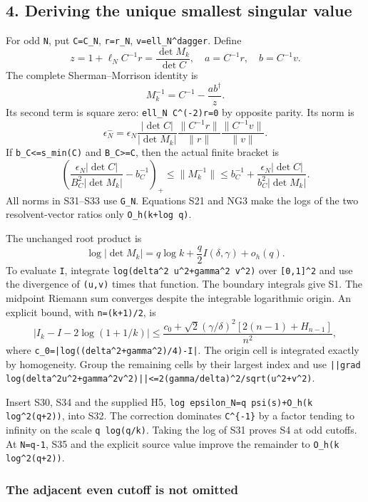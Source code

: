 \documentclass[11pt]{article}
\begin{document}
\subsection{4. Deriving the unique smallest singular value}\label{deriving-the-unique-smallest-singular-value}

For odd \texttt{N}, put \texttt{C=C\_N}, \texttt{r=r\_N}, \texttt{v=ell\_N\^{}dagger}. Define \[
 z=1+\ell_NC^{-1}r=\frac{\det M_k}{\det C},\quad
 a=C^{-1}r,\quad b=C^{-1}v.
\] The complete Sherman--Morrison identity is \[
 M_k^{-1}=C^{-1}-\frac{ab^\dagger}{z}.                            \tag{S31}
\] Its second term is square zero: \texttt{ell\_N\ C\^{}(-2)r=0} by opposite parity. Its norm is \[
 \epsilon_N^-=
 \epsilon_N\frac{|\det C|}{|\det M_k|}
 \frac{\|C^{-1}r\|}{\|r\|}\frac{\|C^{-1}v\|}{\|v\|}.             \tag{S32}
\] If \texttt{b\_C\textless{}=s\_min(C)} and \texttt{B\_C\textgreater{}=\textbar{}\textbar{}C\textbar{}\textbar{}}, then the actual finite bracket is \[
 \left(\frac{\epsilon_N|\det C|}{B_C^2|\det M_k|}-b_C^{-1}\right)_+
 \le\|M_k^{-1}\|
 \le b_C^{-1}+\frac{\epsilon_N|\det C|}{b_C^2|\det M_k|}.           \tag{S33}
\] All norms in S31--S33 use \texttt{G\_N}. Equations S21 and NG3 make the logs of the two resolvent-vector ratios only \texttt{O\_h(k+log\ q)}.

The unchanged root product is \[
 \log|\det M_k|=q\log k+\frac q2 I(\delta,\gamma)+o_h(q).           \tag{S34}
\] To evaluate \texttt{I}, integrate \nolinkurl{log(delta^2 u^2+gamma^2 v^2)} over \texttt{{[}0,1{]}\^{}2} and use the divergence of \texttt{(u,v)} times that function. The boundary integrals give S1. The midpoint Riemann sum converges despite the integrable logarithmic origin. An explicit bound, with \texttt{n=(k+1)/2}, is \[
 \left|I_k-I-2\log(1+1/k)\right|
 \le\frac{c_0+\sqrt2(\gamma/\delta)^2[2(n-1)+H_{n-1}]}{n^2},       \tag{S35}
\] where \nolinkurl{c_0=|log((delta^2+gamma^2)/4)-I|}. The origin cell is integrated exactly by homogeneity. Group the remaining cells by their largest index and use \nolinkurl{||grad log(delta^2u^2+gamma^2v^2)||<=2(gamma/delta)^2/sqrt(u^2+v^2)}.

Insert S30, S34 and the supplied H5, \nolinkurl{log epsilon_N=q psi(s)+O_h(k log^2(q+2))}, into S32. The correction dominates \texttt{C\^{}\{-1\}} by a factor tending to infinity on the scale \texttt{q\ log(q/k)}. Taking the log of S31 proves S4 at odd cutoffs. At \texttt{N=q-1}, S35 and the explicit source value improve the remainder to \nolinkurl{O_h(k log^2(q+2))}.

\subsubsection{The adjacent even cutoff is not omitted}\label{the-adjacent-even-cutoff-is-not-omitted}
\end{document}

